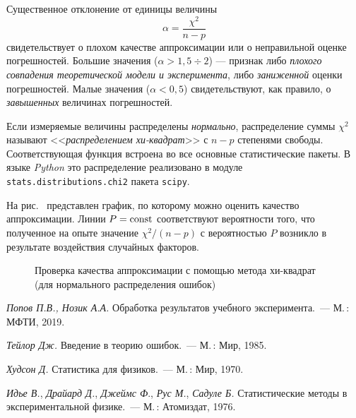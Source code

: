\begin{booksupplement}
\begin{description}[font=\mdseries\sffamily]
    Существенное отклонение от единицы величины 
    \[
     \alpha = \frac{\chi^2}{n-p}
    \] 
    свидетельствует о плохом качестве аппроксимации или о неправильной оценке погрешностей.
    Большие значения ($\alpha >1,5 \div 2$) --- признак либо \emph{плохого совпадения теоретической
    модели и эксперимента}, либо \emph{заниженной} оценки погрешностей.
    Малые значения ($\alpha <0,5$) свидетельствуют, как правило, о
    \emph{завышенных} величинах погрешностей.
    
    Если измеряемые величины распределены \emph{нормально}, распределение суммы
    $\chi^2$ называют <<\emph{распределением хи-квадрат}>> с $n-p$ степенями
    свободы. Соответствующая функция встроена во все основные 
    статистические пакеты. В языке \emph{Python} это распределение 
    реализовано в модуле \texttt{stats.distributions.chi2}
    пакета \texttt{scipy}.
    
    На рис.~ представлен график, 
    по которому     можно оценить качество аппроксимации. Линии 
    $P=\mathrm{const}$ соответствуют вероятности того, что 
    полученное на опыте значение $\chi^2/(n-p)$ с вероятностью $P$ 
    возникло в результате воздействия случайных факторов.

    \begin{figure}[h!]\small\centering
        \caption{Проверка качества аппроксимации с помощью метода хи-квадрат
            (для нормального распределения ошибок)}
    \end{figure}    
   
\end{description}


\newpage

\begin{lab:literature}
    \item \textit{Попов П.В., Нозик А.А.} Обработка результатов
    учебного эксперимента.~--- М.\,: МФТИ, 2019.

    \item \textit{Тейлор Дж.} Введение в теорию ошибок.~---
    М.\,: Мир, 1985.
%    
%    
    
    \item \textit{Худсон Д.} Статистика для физиков.~---
    М.\,: Мир, 1970.
    
    \item \textit{Идье В.}, \textit{Драйард Д.}, \textit{Джеймс Ф}., \textit{Рус М.}, \textit{Садуле Б.} 
    Статистические методы в экспериментальной физике.~---
    М.\,: Атомиздат, 1976. 
\end{lab:literature}

\end{booksupplement}
